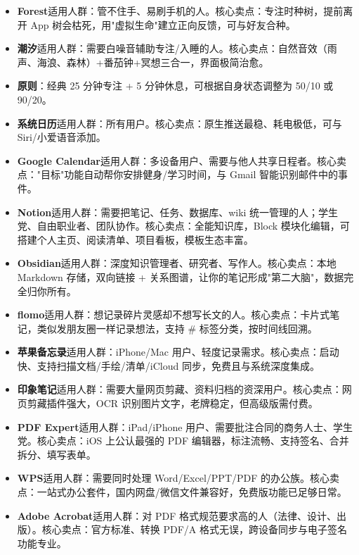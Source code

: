 
\begin{itemize}
  \item \textbf{Forest}适用人群：管不住手、易刷手机的人。核心卖点：专注时种树，提前离开 App 树会枯死，用"虚拟生命"建立正向反馈，可与好友合种。
  \item \textbf{潮汐}适用人群：需要白噪音辅助专注/入睡的人。核心卖点：自然音效（雨声、海浪、森林）+番茄钟+冥想三合一，界面极简治愈。
  \item \textbf{原则}：经典 25 分钟专注 + 5 分钟休息，可根据自身状态调整为 50/10 或 90/20。
\end{itemize}


\begin{itemize}
  \item \textbf{系统日历}适用人群：所有用户。核心卖点：原生推送最稳、耗电极低，可与 Siri/小爱语音添加。
  \item \textbf{Google Calendar}适用人群：多设备用户、需要与他人共享日程者。核心卖点："目标"功能自动帮你安排健身/学习时间，与 Gmail 智能识别邮件中的事件。
\end{itemize}


\begin{itemize}
  \item \textbf{Notion}适用人群：需要把笔记、任务、数据库、wiki 统一管理的人；学生党、自由职业者、团队协作。核心卖点：全能知识库，Block 模块化编辑，可搭建个人主页、阅读清单、项目看板，模板生态丰富。
  \item \textbf{Obsidian}适用人群：深度知识管理者、研究者、写作人。核心卖点：本地 Markdown 存储，双向链接 + 关系图谱，让你的笔记形成"第二大脑"，数据完全归你所有。
  \item \textbf{flomo}适用人群：想记录碎片灵感却不想写长文的人。核心卖点：卡片式笔记，类似发朋友圈一样记录想法，支持 \# 标签分类，按时间线回溯。
  \item \textbf{苹果备忘录}适用人群：iPhone/Mac 用户、轻度记录需求。核心卖点：启动快、支持扫描文档/手绘/清单/iCloud 同步，免费且与系统深度集成。
  \item \textbf{印象笔记}适用人群：需要大量网页剪藏、资料归档的资深用户。核心卖点：网页剪藏插件强大，OCR 识别图片文字，老牌稳定，但高级版需付费。
\end{itemize}


\begin{itemize}
  \item \textbf{PDF Expert}适用人群：iPad/iPhone 用户、需要批注合同的商务人士、学生党。核心卖点：iOS 上公认最强的 PDF 编辑器，标注流畅、支持签名、合并拆分、填写表单。
  \item \textbf{WPS}适用人群：需要同时处理 Word/Excel/PPT/PDF 的办公族。核心卖点：一站式办公套件，国内网盘/微信文件兼容好，免费版功能已足够日常。
  \item \textbf{Adobe Acrobat}适用人群：对 PDF 格式规范要求高的人（法律、设计、出版）。核心卖点：官方标准、转换 PDF/A 格式无误，跨设备同步与电子签名功能专业。
\end{itemize}

